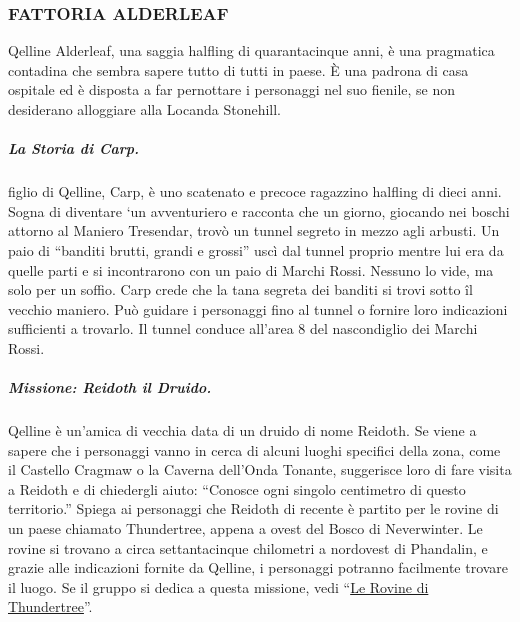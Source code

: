 \documentclass{article}
\begin{document}
\subsubsection{FATTORIA ALDERLEAF}
\hypertarget{fattoria}{}
Qelline Alderleaf, una saggia halfling di quarantacinque anni,
è una pragmatica contadina che sembra sapere tutto di tutti
in paese. È una padrona di casa ospitale ed è disposta a far
pernottare i personaggi nel suo fienile, se non desiderano
alloggiare alla Locanda Stonehill.
\subparagraph{La Storia di Carp.}figlio di Qelline, Carp, è uno scatenato
e precoce ragazzino halfling di dieci anni. Sogna di diventare
‘un avventuriero e racconta che un giorno, giocando nei boschi
attorno al Maniero Tresendar, trovò un tunnel segreto in
mezzo agli arbusti. Un paio di “banditi brutti, grandi e grossi”
uscì dal tunnel proprio mentre lui era da quelle parti e si
incontrarono con un paio di Marchi Rossi. Nessuno lo vide, ma
solo per un soffio. Carp crede che la tana segreta dei banditi si
trovi sotto îl vecchio maniero. Può guidare i personaggi fino al
tunnel o fornire loro indicazioni sufficienti a trovarlo. Il tunnel
conduce all’area 8 del nascondiglio dei Marchi Rossi.
\subparagraph{Missione: Reidoth il Druido.}
Qelline è un'amica di vecchia
data di un druido di nome Reidoth. Se viene a sapere che
i personaggi vanno in cerca di alcuni luoghi specifici della
zona, come il Castello Cragmaw o la Caverna dell’Onda
Tonante, suggerisce loro di fare visita a Reidoth e di chiedergli
aiuto: “Conosce ogni singolo centimetro di questo territorio.”
Spiega ai personaggi che Reidoth di recente è partito per
le rovine di un paese chiamato Thundertree, appena a
ovest del Bosco di Neverwinter. Le rovine si trovano a circa
settantacinque chilometri a nordovest di Phandalin, e grazie
alle indicazioni fornite da Qelline, i personaggi potranno
facilmente trovare il luogo. Se il gruppo si dedica a questa
missione, vedi “\hyperlink{rovine}{Le Rovine di Thundertree}”.
\end{document}
